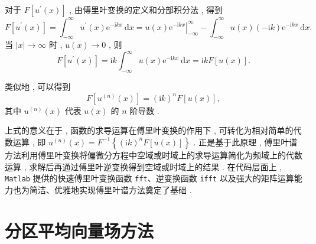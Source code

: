 对于 $F\left[u^{\prime}(x)\right]$ , 由傅里叶变换的定义和分部积分法 , 得到
\begin{equation}
    F\left[u^{\prime}(x)\right] = \int_{-\infty}^{\infty} u^{\prime}(x) \mathrm{e}^{-\mathrm{i} k x} \mathrm{~d} x = \left . u(x) \mathrm{e}^{-\mathrm{i} k x}\right|_{-\infty}^{\infty} - \int_{-\infty}^{\infty} u(x)(-\mathrm{i} k) \mathrm{e}^{-\mathrm{i} k x} \mathrm{~d} x . \label{eq:3-7}
\end{equation}
当 $\mid x\mid  \rightarrow \infty$ 时 , $u(x) \rightarrow 0$ , 则
\begin{equation}
    F\left[u^{\prime}(x)\right] = \mathrm{i} k \int_{-\infty}^{\infty} u(x) \mathrm{e}^{-\mathrm{i} k x} \mathrm{~d} x = \mathrm{i} k F[u(x)] . \label{eq:3-8}
\end{equation}

类似地 , 可以得到
\begin{equation}
    F\left[u^{(n)}(x)\right] = (\mathrm{i} k)^n F[u(x)] , \label{eq:3-9}
\end{equation}
其中 $u^{(n)}(x)$ 代表 $u(x)$ 的 $n$ 阶导数 . 

上式的意义在于 , 函数的求导运算在傅里叶变换的作用下 , 可转化为相对简单的代数运算 , 即 $u^{(n)}(x) = F^{-1}\left\{(\mathrm{i} k)^n F[u(x)]\right\}$ . 正是基于此原理 , 傅里叶谱方法利用傅里叶变换将偏微分方程中空域或时域上的求导运算简化为频域上的代数运算 , 求解后再通过傅里叶逆变换得到空域或时域上的结果 . 在代码层面上 , \texttt{Matlab} 提供的快速傅里叶变换函数 \texttt{fft}、逆变换函数 \texttt{ifft} 以及强大的矩阵运算能力也为简洁、优雅地实现傅里叶谱方法奠定了基础 . 


\section{分区平均向量场方法}


